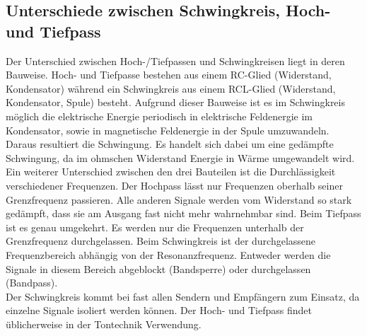 \documentclass[a4paper,usenatbib]{aspdoc}
\begin{document}
        
        \subsection{Unterschiede zwischen Schwingkreis, Hoch- und Tiefpass}
            Der Unterschied zwischen Hoch-/Tiefpassen und Schwingkreisen liegt in deren Bauweise. Hoch- und Tiefpasse bestehen aus einem RC-Glied (Widerstand, Kondensator) während ein Schwingkreis aus einem RCL-Glied (Widerstand, Kondensator, Spule) besteht. Aufgrund dieser Bauweise ist es im Schwingkreis möglich die elektrische Energie periodisch in elektrische Feldenergie im Kondensator, sowie in magnetische Feldenergie in der Spule umzuwandeln. Daraus resultiert die Schwingung. Es handelt sich dabei um eine gedämpfte Schwingung, da im ohmschen Widerstand Energie in Wärme umgewandelt wird.\\
            Ein weiterer Unterschied zwischen den drei Bauteilen ist die Durchlässigkeit verschiedener Frequenzen. Der Hochpass lässt nur Frequenzen oberhalb seiner Grenzfrequenz passieren. Alle anderen Signale werden vom Widerstand so stark gedämpft, dass sie am Ausgang fast nicht mehr wahrnehmbar sind. Beim Tiefpass ist es genau umgekehrt. Es werden nur die Frequenzen unterhalb der Grenzfrequenz durchgelassen. Beim Schwingkreis ist der durchgelassene Frequenzbereich abhängig von der Resonanzfrequenz. Entweder werden die Signale in diesem Bereich abgeblockt (Bandsperre) oder durchgelassen (Bandpass).\\
            Der Schwingkreis kommt bei fast allen Sendern und Empfängern zum Einsatz, da einzelne Signale isoliert werden können. Der Hoch- und Tiefpass findet üblicherweise in der Tontechnik Verwendung. 
        
\end{document}
